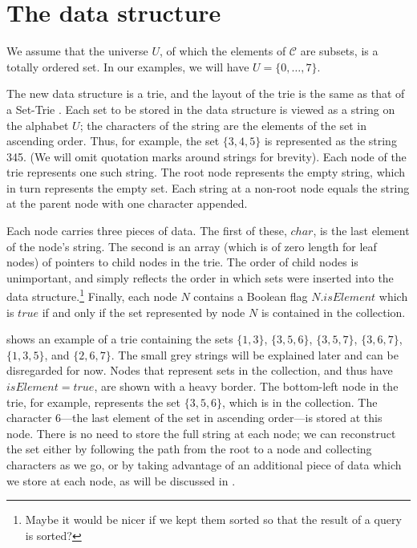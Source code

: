 \section{The data structure}

We assume that the universe $U$, of which the elements of $\mathcal{C}$ are
subsets, is a totally ordered set.  In our examples, we will have $U = \{0, \dots, 7\}$.

The new data structure is a trie, and the layout of the trie is the same as
that of a Set-Trie \cite{DBLP:conf/IEEEares/Savnik13}.  Each set to be stored
in the data structure is viewed as a
string on the alphabet $U$; the characters of the string are the
elements of the set in ascending order.  Thus, for example, the set $\{3,4,5\}$ is
represented as the string 345.  (We will omit quotation marks around strings
for brevity).  Each node of the trie
represents one such string. The root node represents the empty string,
which in turn represents the empty set.  Each string at a non-root node equals the string at
the parent node with one character appended.

Each node carries three pieces of data.  The first of these, $\mathit{char}$,
is the last element of the node's string.  The second is an array (which is of
zero length for leaf nodes) of pointers to child nodes in the trie. The order
of child nodes is unimportant, and simply reflects the order in which sets were
inserted into the data structure.\footnote{Maybe it would be nicer if we kept
them sorted so that the result of a query is sorted?} Finally, each node $N$
contains a Boolean flag $N.\mathit{isElement}$ which is $\mathit{true}$ if
and only if the set represented by node $N$ is contained in the collection.

 shows an example of a trie containing the sets
$\{1,3\}$,
$\{3,5,6\}$,
$\{3,5,7\}$,
$\{3,6,7\}$,
$\{1,3,5\}$, and
$\{2,6,7\}$.  The small grey strings will be explained later and can be disregarded
for now.  Nodes that represent sets in the collection, and thus have $\mathit{isElement}=\mathit{true}$,
    are shown with a heavy border.
The bottom-left node in the trie, for example, represents the set $\{3,5,6\}$, which is in the
collection.  The character 6---the last element of the set in ascending order---is
stored at this node.  There is no need to store the full string at each node; we can
reconstruct the set either by following the path from the root to a node and collecting
characters as we go, or by taking advantage of an additional piece of data which we store
at each node, as will be discussed in .


